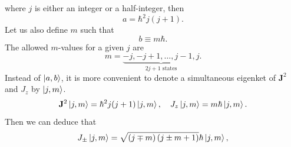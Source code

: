 \documentclass{article}
\theoremstyle{1}
\begin{document}
where $j$ is either an integer or a half-integer, then 
\begin{equation}
    a=\hbar^2 j(j+1).
\end{equation}
Let us also define $m$ such that 
\begin{equation}
    b\equiv m\hbar.
\end{equation}
The allowed $m$-values for a given $j$ are
\begin{equation}
    m=\underset{2j+1 \text{ states}}{\underbrace{-j,-j+1,\dots,j-1,j}}.
\end{equation}
Instead of $\ket{a,b}$, it is more convenient to denote a simultaneous eigenket of $\mathbf{J}^2$
and $J_z$ by $\ket{j,m}$.
\begin{equation}\label{13.34}
    \mathbf{J}^2\ket{j,m}=\hbar^2 j(j+1)\ket{j,m},\quad J_z\ket{j,m}=m\hbar\ket{j,m}.
\end{equation}
Then we can deduce that 
\begin{equation}
    J_\pm\ket{j,m}=\sqrt{\left(j\mp m\right)\left(j\pm m+1\right)}\hbar\ket{j,m},
\end{equation}
\end{document}
